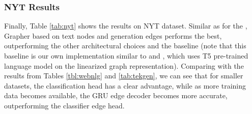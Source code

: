 \subsubsection{NYT Results}
Finally, Table \ref{tab:nyt} shows the results on NYT dataset. Similar as for the \tekgen, Grapher based on text nodes and generation edges performs the best, outperforming the other architectural choices and the baseline (note that this baseline is our own implementation similar to \cite{dognin2021regen} and \cite{agarwal-etal-2020-machine}, which uses T5 pre-trained language model on the linearized graph representation). Comparing with the results from Tables \ref{tbl:webnlg} and \ref{tab:tekgen}, we can see that for smaller datasets, the classification head has a clear advantage, while as more training data becomes available, the GRU edge decoder becomes more accurate, outperforming the classifier edge head. 

